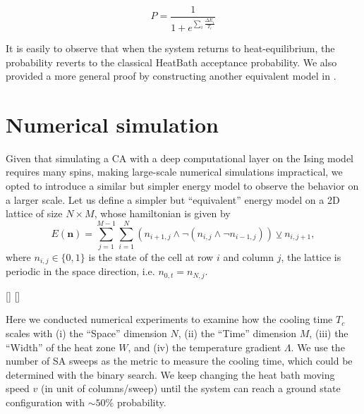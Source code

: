 \documentclass[twocolumn,superscriptaddress,english,showpacs,longbibliography]{revtex4-2}
\newcommand{\jinguo}[1]{[{\color{blue}{JGL: #1}}]}
\newcommand{\ym}[1]{[{\color{red}{YM: #1}}]}
\newcommand{\vn}{{\mathbf{n}}}
\begin{document}
\begin{equation}
    \label{eq:non-equilibrium-SA}
P = \frac{1}{1 + e^{\sum_i \frac{\Delta E_i}{T_i}}}
\end{equation}

It is easily to observe that when the system returns to
heat-equilibrium, the probability reverts to the classical HeatBath
acceptance probability. We also provided a more general proof by constructing another equivalent model in .


\section{Numerical simulation}\label{sec:numerical-result}

Given that simulating a CA with a deep computational layer on the Ising model requires many spins, making large-scale numerical simulations impractical, we opted to introduce a similar but simpler energy model to observe the behavior on a larger scale.
Let us define a simpler but ``equivalent'' energy model on a 2D lattice of size $N \times M$, whose hamiltonian
is given by
\begin{equation}\label{eq:toy-hamiltonian}
E(\vn) = \sum_{j=1}^{M-1}\sum_{i=1}^{N} (n_{i+1, j} \land \neg(n_{i, j} \land \neg n_{i-1, j})) \veebar n_{i,j+1},
\end{equation}
where $n_{i, j} \in \{0, 1\}$ is the state of the cell at row $i$ and column $j$, the lattice is periodic in the space direction, i.e. $n_{0, t} = n_{N, j}$.

\jinguo{show a comparison from right to left}
\ym{I will do this in the next version.}

Here we conducted numerical experiments to examine how the cooling time $T_{c}$ scales with (i)
the ``Space'' dimension $N$, (ii) the ``Time'' dimension $M$, (iii) the ``Width'' of the heat zone $W$, and (iv) the temperature gradient $\Lambda$.
We use the number of SA sweeps as the metric to measure the cooling time, which could be determined with the binary search.
We keep changing the heat bath moving speed $v$ (in unit of columns/sweep) until the system can reach a ground state configuration with $\sim 50\%$ probability.
\end{document}
